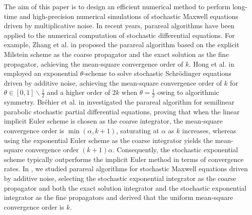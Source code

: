 \documentclass[preprint,12pt]{elsarticle}
\begin{document}
   The aim of this paper is to design an efficient numerical method to perform long-time and high-precision numerical simulations of stochastic Maxwell equations driven by multiplicative noise.  In recent years, parareal algorithms have been applied to the numerical computation of stochastic differential equations. For example, Zhang et al. in \citep{ZhangWang2020} proposed the parareal algorithm based on the explicit Milstein scheme as the coarse propagator and the exact solution as the fine propagator, achieving the mean-square convergence order of $k$. Hong et al. in \citep{Hongetal2019}  employed an exponential $\theta$-scheme to solve stochastic Schr\"odinger equations driven by additive noise, achieving the mean-square convergence order of $k$ for $\theta \in [0,1] \backslash {\frac{1}{2}}$ and a higher order of $2k$ when $\theta = \frac{1}{2}$ owing to algorithmic symmetry. Br\'ehier et al. in \citep{BrehierWang2020} investigated the parareal algorithm for semilinear parabolic stochastic partial differential equations, proving that when the linear implicit Euler scheme is chosen as the coarse integrator, the mean-square convergence order is $\min(\alpha,k+1)$, saturating at  $\alpha$ as $k$ increases, whereas using the exponential Euler scheme as the coarse integrator yields the mean-square convergence order $(k+1)\alpha$. Consequently, the stochastic exponential scheme typically outperforms the implicit Euler method in terms of convergence rates. In \citep{ZhangZhang}, we studied parareal algorithms for stochastic Maxwell equations driven by additive noise, selecting the stochastic exponential integrator  as the coarse propagator and both the exact solution integrator and the stochastic exponential integrator as the fine propagators and derived that the uniform mean-square convergence order is $k$. 
    
\end{document}
